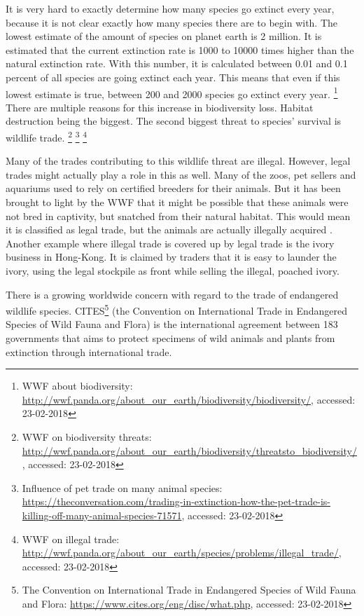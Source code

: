 It is very hard to exactly determine how many species go extinct every year, because it is not clear exactly how many species there are to begin with. The lowest estimate of the amount of species on planet earth is 2 million. It is estimated that the current extinction rate is 1000 to 10000 times higher than the natural extinction rate. With this number, it is calculated between 0.01 and 0.1 percent of all species are going extinct each year. This means that even if this lowest estimate is true, between 200 and 2000 species go extinct every year. \footnote {WWF about biodiversity: \url{http://wwf.panda.org/about_our_earth/biodiversity/biodiversity/}, accessed: 23-02-2018} There are multiple reasons for this increase in biodiversity loss. Habitat destruction being the biggest. The second biggest threat to species' survival is wildlife trade. \footnote {WWF on biodiversity threats: \url{http://wwf.panda.org/about_our_earth/biodiversity/threatsto_biodiversity/}, accessed: 23-02-2018} \footnote {Influence of pet trade on many animal species: \url{https://theconversation.com/trading-in-extinction-how-the-pet-trade-is-killing-off-many-animal-species-71571}, accessed: 23-02-2018} \footnote {WWF on illegal trade: \url{http://wwf.panda.org/about_our_earth/species/problems/illegal_trade/}, accessed: 23-02-2018}

Many of the trades contributing to this wildlife threat are illegal. However, legal trades might actually play a role in this as well. Many of the zoos, pet sellers and aquariums used to rely on certified breeders for their animals. But it has been brought to light by the WWF that it might be possible that these animals were not bred in captivity, but snatched from their natural habitat. This would mean it is classified as legal trade, but the animals are actually illegally acquired \cite{trafficWWF} \cite{Nijman2015}. Another example where illegal trade is covered up by legal trade is the ivory business in Hong-Kong. It is claimed by traders that it is easy to launder the ivory, using the legal stockpile as front while selling the illegal, poached ivory. \cite{Lo2015}



There is a growing worldwide concern with regard to the trade of endangered wildlife species. CITES\footnote {The Convention on International Trade in Endangered Species of Wild Fauna and Flora: \url{https://www.cites.org/eng/disc/what.php}, accessed: 23-02-2018} (the Convention on International Trade in Endangered Species of Wild Fauna and Flora) is the international agreement between 183 governments that aims to protect specimens of wild animals and plants from extinction through international trade.


